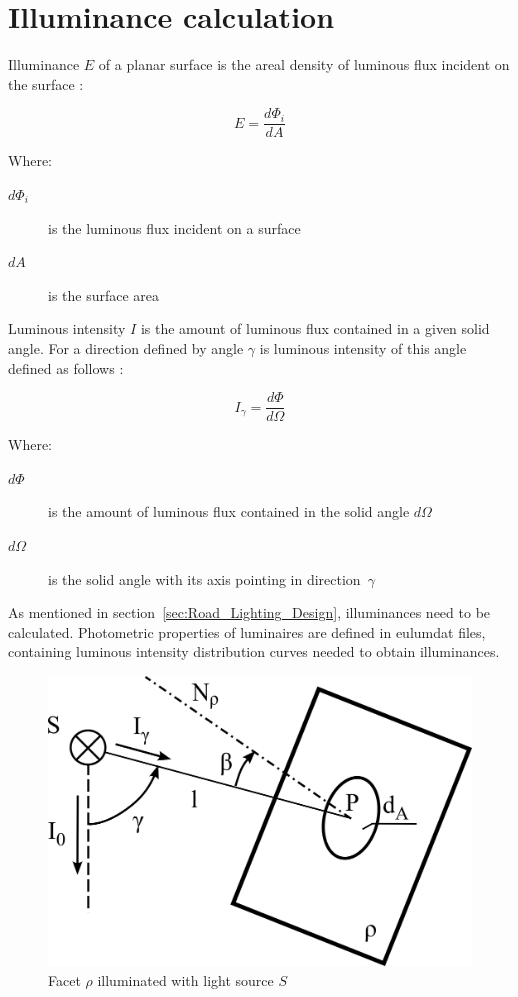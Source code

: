 \section{Illuminance calculation}
Illuminance $E$ of a planar surface is the areal density of luminous flux incident on the surface \cite{Habel}:

\begin{equation}
E=\frac{d\Phi_{i}}{dA}
\end{equation}

Where:
\begin{description}
	\item[$d\Phi_{i}$] is the luminous flux incident on a surface
	\item[$dA$] is the surface area
\end{description}

Luminous intensity $I$ is the amount of luminous flux contained in a given solid angle. For a direction defined by angle $\gamma$ is luminous intensity of this angle defined as follows \cite{Habel}:

\begin{equation}
I_{\gamma}=\frac{d\Phi}{d\Omega}
\end{equation}

Where:
\begin{description}
	\item[$d\Phi$] is the amount of luminous flux contained in the solid angle $d\Omega$
	\item[$d\Omega$] is the solid angle with its axis pointing in direction~$\gamma$
\end{description}

As mentioned in section~\ref{sec:Road_Lighting_Design}, illuminances need to be calculated. Photometric properties of luminaires are defined in eulumdat files, containing luminous intensity distribution curves needed to obtain illuminances.

\begin{figure}[htb]
  \centering
  \includegraphics[width=0.8\columnwidth]{315_osvetlenost_bodovym_zdrojem}
  \caption{Facet $\rho$ illuminated with light source $S$}
  \label{fig:illuminance}
\end{figure}

